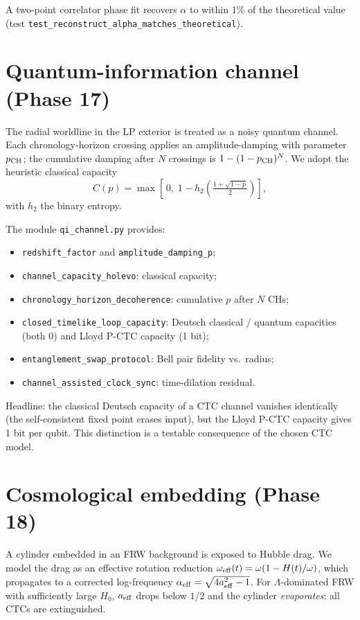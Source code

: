 \documentclass[11pt,a4paper]{article}
\begin{document}
A two-point correlator phase fit recovers $\alpha$ to within $1\%$
of the theoretical value (test \texttt{test\_reconstruct\_alpha\_matches\_theoretical}).

\section{Quantum-information channel (Phase 17)}

The radial worldline in the LP exterior is treated as a noisy
quantum channel. Each chronology-horizon crossing applies an
amplitude-damping with parameter $p_{\rm CH}$; the cumulative
damping after $N$ crossings is $1 - (1 - p_{\rm CH})^N$. We adopt
the heuristic classical capacity
\[
C(p) = \max\!\left[\,0,\; 1 - h_2\!\left(\tfrac{1+\sqrt{1-p}}{2}\right)\right],
\]
with $h_2$ the binary entropy.

The module \texttt{qi\_channel.py} provides:
\begin{itemize}
\item \texttt{redshift\_factor} and \texttt{amplitude\_damping\_p};
\item \texttt{channel\_capacity\_holevo}: classical capacity;
\item \texttt{chronology\_horizon\_decoherence}: cumulative $p$ after $N$ CHs;
\item \texttt{closed\_timelike\_loop\_capacity}: Deutsch classical / quantum
  capacities (both 0) and Lloyd P-CTC capacity (1 bit);
\item \texttt{entanglement\_swap\_protocol}: Bell pair fidelity vs.\ radius;
\item \texttt{channel\_assisted\_clock\_sync}: time-dilation residual.
\end{itemize}

Headline: the classical Deutsch capacity of a CTC channel vanishes
identically (the self-consistent fixed point erases input), but the
Lloyd P-CTC capacity gives 1 bit per qubit. This distinction is a
testable consequence of the chosen CTC model.

\section{Cosmological embedding (Phase 18)}

A cylinder embedded in an FRW background is exposed to Hubble drag.
We model the drag as an effective rotation reduction
$\omega_{\rm eff}(t) = \omega(1 - H(t)/\omega)$, which propagates to a
corrected log-frequency $\alpha_{\rm eff} = \sqrt{4 a_{\rm eff}^2 - 1}$.
For $\Lambda$-dominated FRW with sufficiently large $H_0$, $a_{\rm eff}$
drops below $1/2$ and the cylinder \emph{evaporates}: all CTCs are
extinguished.
\end{document}
